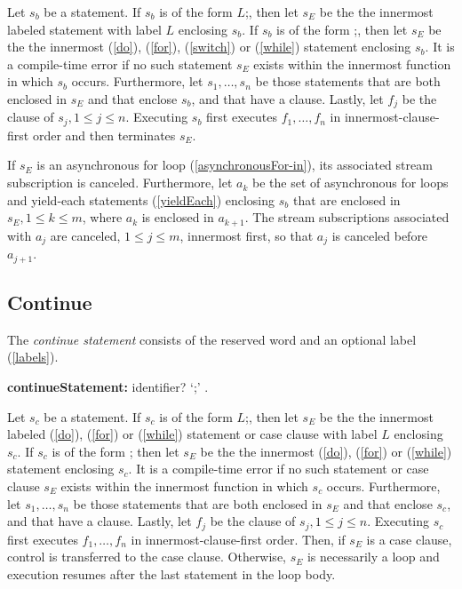 \documentclass{article}
\newcommand{\code}[1]{{\sf #1}}
\begin{document}
\LMHash{}
Let $s_b$ be a \BREAK{} statement. If $s_b$ is of the form  \code{\BREAK{} $L$;}, then let $s_E$ be the the innermost labeled statement with label $L$ enclosing $s_b$. If $s_b$ is of the form \code{\BREAK{};},  then let $s_E$ be the the innermost  \DO{} (\ref{do}), \FOR{} (\ref{for}), \SWITCH{} (\ref{switch}) or \WHILE{} (\ref{while}) statement enclosing  $s_b$. It is a compile-time error if no such statement $s_E$ exists within the innermost function in which  $s_b$ occurs.  Furthermore, let $s_1, \ldots, s_n$ be those \TRY{} statements that are both enclosed in $s_E$ and that enclose  $s_b$, and that have a \FINALLY{} clause. Lastly, let $f_j$ be the \FINALLY{} clause of $s_j, 1 \le j \le n$.   Executing  $s_b$ first executes $f_1, \ldots,  f_n$ in innermost-clause-first  order and then terminates $s_E$. 

\LMHash{}
If $s_E$ is an asynchronous for loop (\ref{asynchronousFor-in}), its associated stream subscription is canceled. Furthermore, let $a_k$ be the set of asynchronous for loops  and yield-each statements (\ref{yieldEach}) enclosing $s_b$ that are enclosed in $s_E , 1 \le k \le m$, where $a_k$ is enclosed in $a_{k+1}$.   The stream subscriptions associated with $a_j$ are canceled, $1 \le j \le m$, innermost first, so that $a_j$ is canceled before $a_{j+1}$. 



\subsection{ Continue}

\LMHash{}
The {\em continue statement} consists of the reserved word \CONTINUE{} and an optional label (\ref{labels}). 

\begin{grammar}
{\bf continueStatement:}
    \CONTINUE{} identifier? `{\escapegrammar ;}'
        .
 \end{grammar}      
 
\LMHash{}
 Let $s_c$ be a \CONTINUE{} statement. If $s_c$ is of the form  \code{\CONTINUE{} $L$;}, then let $s_E$ be the the innermost labeled \DO{} (\ref{do}), \FOR{} (\ref{for}) or \WHILE{} (\ref{while}) statement or case clause with label $L$ enclosing $s_c$. If $s_c$ is of the form \code{\CONTINUE{};}  then let $s_E$ be the the innermost  \DO{} (\ref{do}), \FOR{} (\ref{for}) or \WHILE{} (\ref{while}) statement enclosing  $s_c$. It is a compile-time error if no such statement or case clause $s_E$ exists within the innermost function in which  $s_c$ occurs.  Furthermore, let $s_1, \ldots, s_n$ be those \TRY{} statements that are both enclosed in $s_E$ and that enclose  $s_c$, and that have a \FINALLY{} clause. Lastly, let $f_j$ be the \FINALLY{} clause of $s_j, 1 \le j \le n$.   Executing  $s_c$ first executes $f_1, \ldots,  f_n$ in innermost-clause-first  order. Then, if $s_E$ is a case clause, control is transferred to the case clause. Otherwise, $s_E$ is necessarily a loop and execution resumes after the last statement in the loop body.
 
\end{document}
